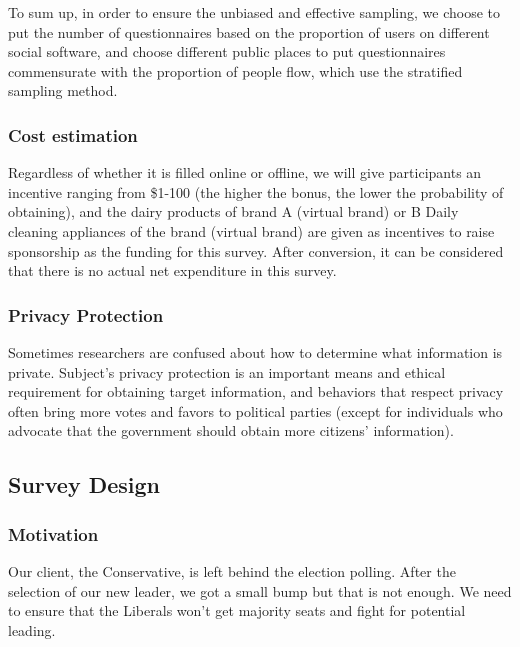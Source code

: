 \documentclass[
]{article}
\begin{document}
To sum up, in order to ensure the unbiased and effective sampling, we
choose to put the number of questionnaires based on the proportion of
users on different social software, and choose different public places
to put questionnaires commensurate with the proportion of people flow,
which use the stratified sampling method.

\hypertarget{cost-estimation}{%
\subsubsection{Cost estimation}\label{cost-estimation}}

Regardless of whether it is filled online or offline, we will give
participants an incentive ranging from \$1-100 (the higher the bonus,
the lower the probability of obtaining), and the dairy products of brand
A (virtual brand) or B Daily cleaning appliances of the brand (virtual
brand) are given as incentives to raise sponsorship as the funding for
this survey. After conversion, it can be considered that there is no
actual net expenditure in this survey.

\hypertarget{privacy-protection}{%
\subsubsection{Privacy Protection}\label{privacy-protection}}

Sometimes researchers are confused about how to determine what
information is private. Subject's privacy protection is an important
means and ethical requirement for obtaining target information, and
behaviors that respect privacy often bring more votes and favors to
political parties (except for individuals who advocate that the
government should obtain more citizens' information).

\hypertarget{survey-design}{%
\subsection{Survey Design}\label{survey-design}}

\hypertarget{motivation}{%
\subsubsection{Motivation}\label{motivation}}

Our client, the Conservative, is left behind the election polling. After
the selection of our new leader, we got a small bump but that is not
enough. We need to ensure that the Liberals won't get majority seats and
fight for potential leading.
\end{document}
